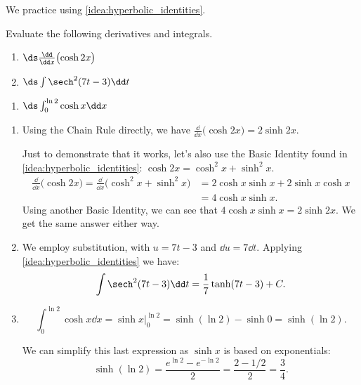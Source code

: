 We practice using \autoref{idea:hyperbolic_identities}.

\begin{example}\label{ex_hf2}
Evaluate the following derivatives and integrals.\\
\begin{minipage}[t]{.5\linewidth}
\begin{enumerate}
\item		$\ds\frac{\dd}{\dd x}\bigl(\cosh 2x\bigr)$
\item		$\ds\int \sech^2(7t-3)\dd t$
\end{enumerate}
\end{minipage}%
\begin{minipage}[t]{.5\linewidth}
\begin{enumerate}\addtocounter{enumi}{2}
\item		$\ds \int_0^{\ln 2} \cosh x\dd x$
\end{enumerate}
\end{minipage}
\solution
\begin{enumerate}
\item		Using the Chain Rule directly, we have $\frac{\dd}{\dd x} \bigl(\cosh 2x\bigr) = 2\sinh 2x$.

Just to demonstrate that it works, let's also use the Basic Identity found in \autoref{idea:hyperbolic_identities}: $\cosh 2x = \cosh^2x+\sinh^2x$.
\begin{align*}
\frac{\dd}{\dd x}\bigl(\cosh 2x\bigr) = \frac{\dd}{\dd x}\bigl(\cosh^2x+\sinh^2x\bigr)
&= 2\cosh x\sinh x+ 2\sinh x\cosh x\\
&= 4\cosh x\sinh x.
\end{align*}
Using another Basic Identity, we can see that $4\cosh x\sinh x = 2\sinh 2x$. We get the same answer either way.

\item	  We employ substitution, with $u = 7t-3$ and $\dd u = 7\dd t$. Applying
\autoref{idea:hyperbolic_identities} we have:
\[\int \sech^2 (7t-3)\dd t = \frac17\tanh (7t-3) + C.\]

\item \[\int_0^{\ln 2} \cosh x\dd x = \sinh x\Big|_0^{\ln 2} = \sinh (\ln 2) - \sinh 0 = \sinh(\ln 2).\]

We can simplify this last expression as $\sinh x$ is based on exponentials:
\[\sinh(\ln 2) = \frac{e^{\ln 2}-e^{-\ln 2}}2 = \frac{2-1/2}{2} = \frac34.\]
\end{enumerate}
\end{example}

